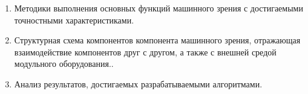 {}
\begin{enumerate}[beginpenalty=10000] %
 \item Методики выполнения основных функций машинного зрения с достигаемыми точностными характеристиками.
 \item Структурная схема компонентов компонента машинного зрения, отражающая взаимодействие компонентов друг с другом, а также с внешней средой модульного оборудования..
 \item Анализ результатов, достигаемых разрабатываемыми алгоритмами.
\end{enumerate}